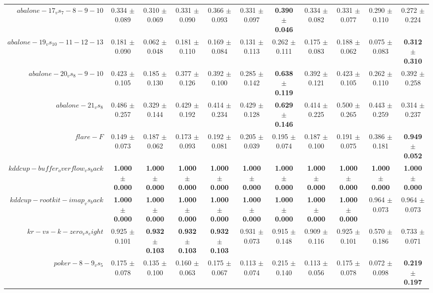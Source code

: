 \begin{table}[!ht]
{\begin{tabular}{r c c c c c c c c c c}
$abalone-17_vs_7-8-9-10$ & 0.334 $\pm$ 0.089 & 0.310 $\pm$ 0.069 & 0.331 $\pm$ 0.090 & 0.366 $\pm$ 0.093 & 0.331 $\pm$ 0.097 & \textbf{0.390 $\pm$ 0.046} & 0.334 $\pm$ 0.082 & 0.331 $\pm$ 0.077 & 0.290 $\pm$ 0.110 & 0.272 $\pm$ 0.224 \\
$abalone-19_vs_10-11-12-13$ & 0.181 $\pm$ 0.090 & 0.062 $\pm$ 0.048 & 0.181 $\pm$ 0.110 & 0.169 $\pm$ 0.084 & 0.131 $\pm$ 0.113 & 0.262 $\pm$ 0.111 & 0.175 $\pm$ 0.083 & 0.188 $\pm$ 0.062 & 0.075 $\pm$ 0.083 & \textbf{0.312 $\pm$ 0.310} \\
$abalone-20_vs_8-9-10$ & 0.423 $\pm$ 0.105 & 0.185 $\pm$ 0.130 & 0.377 $\pm$ 0.126 & 0.392 $\pm$ 0.100 & 0.285 $\pm$ 0.142 & \textbf{0.638 $\pm$ 0.119} & 0.392 $\pm$ 0.121 & 0.423 $\pm$ 0.105 & 0.262 $\pm$ 0.110 & 0.392 $\pm$ 0.258 \\
$abalone-21_vs_8$ & 0.486 $\pm$ 0.257 & 0.329 $\pm$ 0.144 & 0.429 $\pm$ 0.192 & 0.414 $\pm$ 0.234 & 0.429 $\pm$ 0.128 & \textbf{0.629 $\pm$ 0.146} & 0.414 $\pm$ 0.225 & 0.500 $\pm$ 0.265 & 0.443 $\pm$ 0.259 & 0.314 $\pm$ 0.237 \\
$flare-F$ & 0.149 $\pm$ 0.073 & 0.187 $\pm$ 0.062 & 0.173 $\pm$ 0.093 & 0.192 $\pm$ 0.081 & 0.205 $\pm$ 0.039 & 0.195 $\pm$ 0.074 & 0.187 $\pm$ 0.100 & 0.191 $\pm$ 0.075 & 0.386 $\pm$ 0.181 & \textbf{0.949 $\pm$ 0.052} \\
$kddcup-buffer_overflow_vs_back$ & \textbf{1.000 $\pm$ 0.000} & \textbf{1.000 $\pm$ 0.000} & \textbf{1.000 $\pm$ 0.000} & \textbf{1.000 $\pm$ 0.000} & \textbf{1.000 $\pm$ 0.000} & \textbf{1.000 $\pm$ 0.000} & \textbf{1.000 $\pm$ 0.000} & \textbf{1.000 $\pm$ 0.000} & \textbf{1.000 $\pm$ 0.000} & \textbf{1.000 $\pm$ 0.000} \\
$kddcup-rootkit-imap_vs_back$ & \textbf{1.000 $\pm$ 0.000} & \textbf{1.000 $\pm$ 0.000} & \textbf{1.000 $\pm$ 0.000} & \textbf{1.000 $\pm$ 0.000} & \textbf{1.000 $\pm$ 0.000} & \textbf{1.000 $\pm$ 0.000} & \textbf{1.000 $\pm$ 0.000} & \textbf{1.000 $\pm$ 0.000} & 0.964 $\pm$ 0.073 & 0.964 $\pm$ 0.073 \\
$kr-vs-k-zero_vs_eight$ & 0.925 $\pm$ 0.101 & \textbf{0.932 $\pm$ 0.103} & \textbf{0.932 $\pm$ 0.103} & \textbf{0.932 $\pm$ 0.103} & 0.931 $\pm$ 0.073 & 0.915 $\pm$ 0.148 & 0.909 $\pm$ 0.116 & 0.925 $\pm$ 0.101 & 0.570 $\pm$ 0.186 & 0.733 $\pm$ 0.071 \\
$poker-8-9_vs_5$ & 0.175 $\pm$ 0.078 & 0.135 $\pm$ 0.100 & 0.160 $\pm$ 0.063 & 0.175 $\pm$ 0.067 & 0.113 $\pm$ 0.074 & 0.215 $\pm$ 0.140 & 0.113 $\pm$ 0.056 & 0.175 $\pm$ 0.078 & 0.072 $\pm$ 0.098 & \textbf{0.219 $\pm$ 0.197} \\

\end{tabular}}
\end{table}
